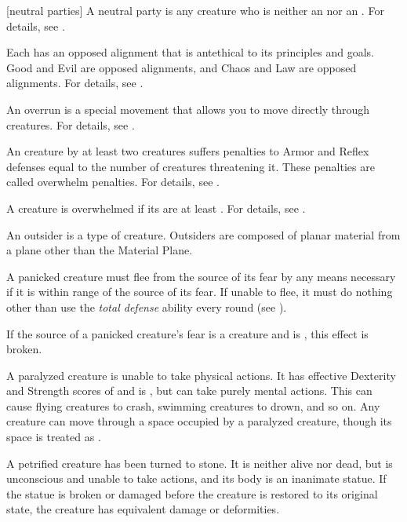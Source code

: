 [neutral parties] A neutral party is any creature who is neither an  nor an .
For details, see .

 Each  has an opposed alignment that is antethical to its principles and goals.
Good and Evil are opposed alignments, and Chaos and Law are opposed alignments.
For details, see .

 An overrun is a special movement that allows you to move directly through creatures.
For details, see .

 An creature  by at least two creatures suffers penalties to Armor and Reflex defenses equal to the number of creatures threatening it.
These penalties are called overwhelm penalties.
For details, see .

 A creature is overwhelmed if its  are at least .
For details, see .

 An outsider is a type of creature.
Outsiders are composed of planar material from a plane other than the Material Plane.

 A panicked creature must flee from the source of its fear by any means necessary if it is within \rngmed range of the source of its fear.
If unable to flee, it must do nothing other than use the \textit{total defense} ability every round (see ).

If the source of a panicked creature's fear is a creature and is , this effect is broken.

 A paralyzed creature is unable to take physical actions. It has effective Dexterity and Strength scores of  and is \helpless, but can take purely mental actions. This can cause flying creatures to crash, swimming creatures to drown, and so on. Any creature can move through a space occupied by a paralyzed creature, though its space is treated as .

 A petrified creature has been turned to stone. It is neither alive nor dead, but is unconscious and unable to take actions, and its body is an inanimate statue. If the statue is broken or damaged before the creature is restored to its original state, the creature has equivalent damage or deformities.


